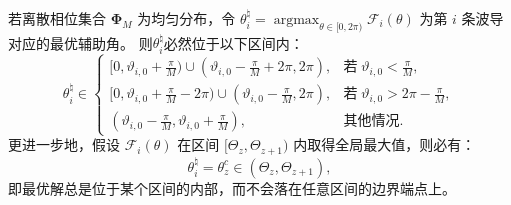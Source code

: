 \begin{proposition}\label{pro:ddma_thetaFlat}
	若离散相位集合 $\bm \Phi_M$ 为均匀分布，令 $\theta_i^{\natural} = \mathop{\arg\max}_{\theta \in [0,2\pi)} \mathcal{F}_i(\theta)$ 为第 $i$ 条波导对应的最优辅助角。
	则$\theta_i^\natural$必然位于以下区间内：
	\begin{equation}\label{eq:ddma_thetaFlatin}
		\theta_i^{\natural} \in
		\begin{cases}
			[0,\vartheta_{i,0}+\frac{\pi}{M})\cup(\vartheta_{i,0}-\frac{\pi}{M}+2\pi,2\pi), & \text{若}\; \vartheta_{i,0} < \frac{\pi}{M}, \\
			[0,\vartheta_{i,0}+\frac{\pi}{M}-2\pi)\cup(\vartheta_{i,0}-\frac{\pi}{M},2\pi), & \text{若}\; \vartheta_{i,0} > 2\pi- \frac{\pi}{M}, \\
			(\vartheta_{i,0}-\frac{\pi}{M}, \vartheta_{i,0}+\frac{\pi}{M}), & \text{其他情况}.
		\end{cases}
	\end{equation}
	更进一步地，假设 $\mathcal{F}_i(\theta)$ 在区间 $[\Theta_z, \Theta_{z+1})$ 内取得全局最大值，则必有：
	\begin{equation}\label{eq:ddma_thetaFlatzc}
		\theta_i^{\natural} = \theta_z^c \in (\Theta_z, \Theta_{z+1}),
	\end{equation}
	即最优解总是位于某个区间的内部，而不会落在任意区间的边界端点上。
\end{proposition}

